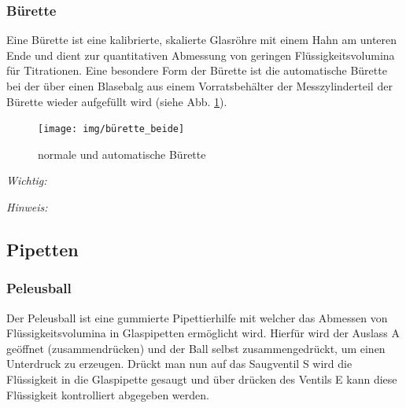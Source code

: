 \newpage


\subsubsection{Bürette}
Eine Bürette ist eine kalibrierte, skalierte Glasröhre mit einem Hahn am unteren Ende und dient zur quantitativen Abmessung von geringen Flüssigkeitsvolumina für Titrationen. Eine besondere Form der Bürette ist die automatische Bürette bei der über einen Blasebalg aus einem Vorratsbehälter der Messzylinderteil der Bürette wieder aufgefüllt wird (siehe Abb. \ref{fig:bürette}).

\begin{figure}[h!]
	\centering
	\texttt{[image: img/bürette\_beide]}
	\caption{normale und automatische Bürette}
	\label{fig:bürette}
\end{figure}
\FloatBarrier

\textit{Wichtig:}\\
\vspace*{-5mm}

	
	\vspace*{5mm}
	
	\textit{Hinweis:}\\
	\vspace*{-5mm}
	
	
	\newpage

\subsection{Pipetten}
\subsubsection*{Peleusball}
Der Peleusball ist eine gummierte Pipettierhilfe mit welcher das Abmessen von Flüssigkeitsvolumina in Glaspipetten ermöglicht wird. Hierfür wird der Auslass A geöffnet (zusammendrücken) und der Ball selbst zusammengedrückt, um einen Unterdruck zu erzeugen. Drückt man nun auf das Saugventil S wird die Flüssigkeit in die Glaspipette gesaugt und über drücken des Ventils E kann diese Flüssigkeit kontrolliert abgegeben werden.

